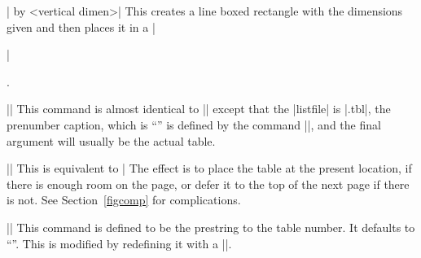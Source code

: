 \mbr
\ext\@| by <vertical dimen>|
\nbr
This creates a line boxed rectangle with the dimensions given and then places
it in a |\centerline|.

\mbr
\ext\@||
\nbr
This command is almost identical to |\figureform| except that the |listfile|
is |.tbl|, the prenumber caption, which is ``\tablelabel'' is 
defined by the command |\tablelabel|,  
and the final argument will usually be the actual table. 

\mbr
\ext\@||
\nbr
This is equivalent to 
\begintt
\beginmidinsert
{}|
\endmidinsert
\endtt
The effect is to place the table at the present location, if there is enough
room on the page, or defer it to the top of the next page if there is not.
See Section~\ref{figcomp} for complications. 


\mbr
\ext\@|\tablelabel|
\nbr
This command is defined to be the prestring to the table number. It defaults
to ``\tablelabel''. This is modified by
redefining it with a |\def\tablelabel {<new label>}|.

\endblockmode
\ejectpage
\done

